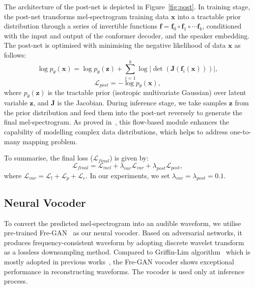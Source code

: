 \documentclass[letterpaper]{article} %
\begin{document}
The architecture of the post-net is depicted in Figure~\ref{fig:post}. In training stage, the post-net transforms mel-spectrogram training data $\boldsymbol{x}$ into a tractable prior distribution through a series of invertible functions $\mathbf{f}=\mathbf{f}_0\circ\mathbf{f}_1\circ\cdots\mathbf{f}_k$, conditioned with the input and output of the conformer decoder, and the speaker embedding. The post-net is optimised with minimising the negative likelihood of data $\boldsymbol{x}$ as follows:
\begin{equation}
    \log p_{\theta}(\boldsymbol{x}) = \log p_{\theta}(\boldsymbol{z}) + \sum_{i=1}^{k}\log |\det(\boldsymbol{J}(\mathbf{f}_i(\boldsymbol{x})))|,
\end{equation}
\begin{equation}
    \mathcal{L}_{post} = - \log p_{\theta}(\boldsymbol{x}),
\end{equation}
where $p_{\theta}(\boldsymbol{z})$ is the tractable prior (isotropic multivariate Gaussian) over latent variable $\boldsymbol{z}$, and $\boldsymbol{J}$ is the Jacobian. During inference stage, we take samples $\boldsymbol{z}$ from the prior distribution and feed them into the post-net reversely to generate the final mel-spectrogram. As proved in~\cite{ren2022revisiting}, this flow-based module enhances the capability of modelling complex data distributions, which helps to address one-to-many mapping problem.

To summarise, the final loss ($\mathcal{L}_{final}$) is given by:
\begin{equation}
    \mathcal{L}_{final} = \mathcal{L}_{mel} + \lambda_{var}\mathcal{L}_{var} + \lambda_{post}\mathcal{L}_{post},
\end{equation}
where $\mathcal{L}_{var}=\mathcal{L}_{l}+\mathcal{L}_{p}+\mathcal{L}_{e}$. In our experiments, we set $\lambda_{var} = \lambda_{post} = 0.1$.

\subsection{Neural Vocoder}
To convert the predicted mel-spectrogram into an audible waveform, we utilise pre-trained Fre-GAN~\cite{kim21f_interspeech} as our neural vocoder. Based on adversarial networks, it produces frequency-consistent waveform by adopting discrete wavelet transform~\cite{daubechies1988orthonormal} as a lossless downsampling method. Compared to Griffin-Lim algorithm~\cite{griffin1984signal} which is mostly adopted in previous works~\cite{kim2021lip,he2022flow,kim2023lip}, the Fre-GAN vocoder shows exceptional performance in reconstructing waveforms.
The vocoder is used only at inference process.
\end{document}
